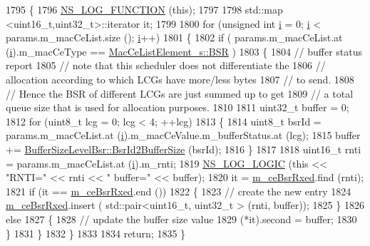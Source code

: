 \begin{DoxyCode}
1795 \{
1796   \hyperlink{log-macros-disabled_8h_a90b90d5bad1f39cb1b64923ea94c0761}{NS\_LOG\_FUNCTION} (\textcolor{keyword}{this});
1797 
1798   std::map <uint16\_t,uint32\_t>::iterator it;
1799 
1800   \textcolor{keywordflow}{for} (\textcolor{keywordtype}{unsigned} \textcolor{keywordtype}{int} \hyperlink{bernuolliDistribution_8m_a6f6ccfcf58b31cb6412107d9d5281426}{i} = 0; \hyperlink{bernuolliDistribution_8m_a6f6ccfcf58b31cb6412107d9d5281426}{i} < params.m\_macCeList.size (); \hyperlink{bernuolliDistribution_8m_a6f6ccfcf58b31cb6412107d9d5281426}{i}++)
1801     \{
1802       \textcolor{keywordflow}{if} ( params.m\_macCeList.at (\hyperlink{bernuolliDistribution_8m_a6f6ccfcf58b31cb6412107d9d5281426}{i}).m\_macCeType == \hyperlink{structns3_1_1MacCeListElement__s_a270a6526dfc7da02e9dc91823c290f6bac50796b01160b1825ec34efa1ad9f051}{MacCeListElement\_s::BSR} )
1803         \{
1804           \textcolor{comment}{// buffer status report}
1805           \textcolor{comment}{// note that this scheduler does not differentiate the}
1806           \textcolor{comment}{// allocation according to which LCGs have more/less bytes}
1807           \textcolor{comment}{// to send.}
1808           \textcolor{comment}{// Hence the BSR of different LCGs are just summed up to get}
1809           \textcolor{comment}{// a total queue size that is used for allocation purposes.}
1810 
1811           uint32\_t buffer = 0;
1812           \textcolor{keywordflow}{for} (uint8\_t lcg = 0; lcg < 4; ++lcg)
1813             \{
1814               uint8\_t bsrId = params.m\_macCeList.at (\hyperlink{bernuolliDistribution_8m_a6f6ccfcf58b31cb6412107d9d5281426}{i}).m\_macCeValue.m\_bufferStatus.at (lcg);
1815               buffer += \hyperlink{classns3_1_1BufferSizeLevelBsr_a67fc905f267ed8ac5a617fe229699122}{BufferSizeLevelBsr::BsrId2BufferSize} (bsrId);
1816             \}
1817           
1818           uint16\_t rnti = params.m\_macCeList.at (\hyperlink{bernuolliDistribution_8m_a6f6ccfcf58b31cb6412107d9d5281426}{i}).m\_rnti;
1819           \hyperlink{group__logging_ga88acd260151caf2db9c0fc84997f45ce}{NS\_LOG\_LOGIC} (\textcolor{keyword}{this} << \textcolor{stringliteral}{"RNTI="} << rnti << \textcolor{stringliteral}{" buffer="} << buffer);
1820           it = \hyperlink{classns3_1_1TtaFfMacScheduler_a6b88fda6059c5679b747c2e1856729b1}{m\_ceBsrRxed}.find (rnti);
1821           \textcolor{keywordflow}{if} (it == \hyperlink{classns3_1_1TtaFfMacScheduler_a6b88fda6059c5679b747c2e1856729b1}{m\_ceBsrRxed}.end ())
1822             \{
1823               \textcolor{comment}{// create the new entry}
1824               \hyperlink{classns3_1_1TtaFfMacScheduler_a6b88fda6059c5679b747c2e1856729b1}{m\_ceBsrRxed}.insert ( std::pair<uint16\_t, uint32\_t > (rnti, buffer));
1825             \}
1826           \textcolor{keywordflow}{else}
1827             \{
1828               \textcolor{comment}{// update the buffer size value}
1829               (*it).second = buffer;
1830             \}
1831         \}
1832     \}
1833 
1834   \textcolor{keywordflow}{return};
1835 \}
\end{DoxyCode}


